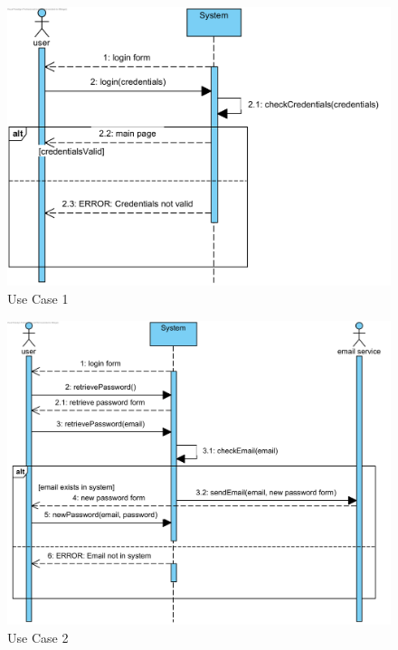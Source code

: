 \documentclass{article}
\begin{document}
\begin{figure}[H]
    \centering
    \includegraphics[width=1\textwidth]{images/UseCaseSequenceDiagrams/UC1}
    \caption{Use Case 1}
    \label{fig:UC1}
\end{figure}

\begin{figure}[H]
    \centering
    \includegraphics[width=1\textwidth]{images/UseCaseSequenceDiagrams/UC2}
    \caption{Use Case 2}
    \label{fig:UC2}
\end{figure}
\end{document}
